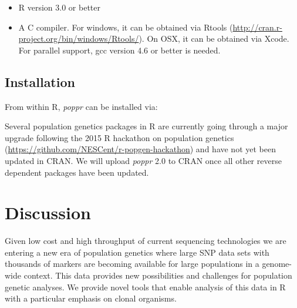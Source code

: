 \documentclass[double,12pt]{beavtex}
\providecommand{\tightlist}{%
  \setlength{\itemsep}{0pt}\setlength{\parskip}{0pt}}
\begin{document}
  \begin{itemize}
  \tightlist
  \item
    R version 3.0 or better
  \item
    A C compiler. For windows, it can be obtained via Rtools
    (\url{http://cran.r-project.org/bin/windows/Rtools/}). On OSX, it can
    be obtained via Xcode. For parallel support, gcc version 4.6 or better
    is needed.
  \end{itemize}
  
  \newpage
  
  \subsection{Installation}\label{installation}
  
  From within R, \emph{poppr} can be installed via:
  
  \begin{Shaded}
  \begin{Highlighting}[]
  \NormalTok{(}\NormalTok{)}
  \NormalTok{(}\NormalTok{)}
  \NormalTok{(}\NormalTok{)}
  \NormalTok{(}\NormalTok{)}
  \end{Highlighting}
  \end{Shaded}
  
  Several population genetics packages in R are currently going through a
  major upgrade following the 2015 R hackathon on population genetics
  (\url{https://github.com/NESCent/r-popgen-hackathon}) and have not yet
  been updated in CRAN. We will upload \emph{poppr} 2.0 to CRAN once all
  other reverse dependent packages have been updated.
  
  \section{Discussion}\label{discussion}
  
  Given low cost and high throughput of current sequencing technologies we
  are entering a new era of population genetics where large SNP data sets
  with thousands of markers are becoming available for large populations
  in a genome- wide context. This data provides new possibilities and
  challenges for population genetic analyses. We provide novel tools that
  enable analysis of this data in R with a particular emphasis on clonal
  organisms.
  
\end{document}

